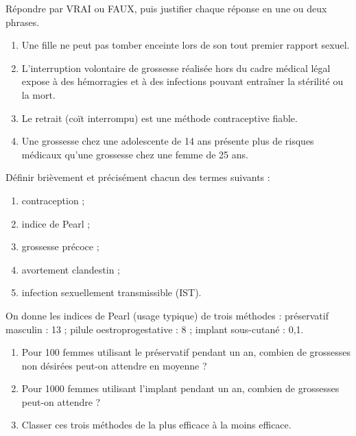 \documentclass[11pt]{article}
\newcounter{popsec}
\newcounter{popsub}
\newcommand{\courssub}[1]{%
  \stepcounter{popsub}%
  \par\vspace{9pt}\noindent{\popxbold\fontsize{11.5}{13}\selectfont\color{popink}{\color{poporange}\thepopsec.\thepopsub}\hspace{6pt}#1}\par\nopagebreak\vspace{4pt}
}
\begin{document}
\begin{exercice}
Répondre par VRAI ou FAUX, puis justifier chaque réponse en une ou deux phrases.
\begin{enumerate}
\item Une fille ne peut pas tomber enceinte lors de son tout premier rapport sexuel.
\item L'interruption volontaire de grossesse réalisée hors du cadre médical légal expose à des hémorragies et à des infections pouvant entraîner la stérilité ou la mort.
\item Le retrait (coït interrompu) est une méthode contraceptive fiable.
\item Une grossesse chez une adolescente de 14 ans présente plus de risques médicaux qu'une grossesse chez une femme de 25 ans.
\end{enumerate}
\end{exercice}

\begin{exercice}[Définitions]
Définir brièvement et précisément chacun des termes suivants :
\begin{enumerate}
\item contraception ;
\item indice de Pearl ;
\item grossesse précoce ;
\item avortement clandestin ;
\item infection sexuellement transmissible (IST).
\end{enumerate}
\end{exercice}

\begin{exercice}
On donne les indices de Pearl (usage typique) de trois méthodes : préservatif masculin : 13 ; pilule oestroprogestative : 8 ; implant sous-cutané : 0,1.
\begin{enumerate}
\item Pour 100 femmes utilisant le préservatif pendant un an, combien de grossesses non désirées peut-on attendre en moyenne ?
\item Pour 1000 femmes utilisant l'implant pendant un an, combien de grossesses peut-on attendre ?
\item Classer ces trois méthodes de la plus efficace à la moins efficace.
\end{enumerate}
\end{exercice}

\courssub{Je m'entraîne}
\end{document}
